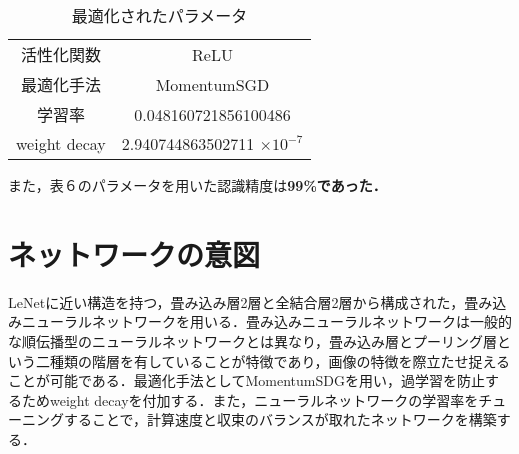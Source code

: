 \documentclass[a4paper, 12pt, dvipdfmx]{jarticle}
\begin{document}
\begin{table}[htb]
  \centering
  \caption{最適化されたパラメータ}
  \begin{tabular}{c|c} \hline
    活性化関数 & ReLU\\
    最適化手法 & MomentumSGD \\
    学習率 & 0.048160721856100486 \\
    weight decay & 2.940744863502711 $\times 10^{-7}$ \\ \hline
  \end{tabular}
\end{table}
また，表６のパラメータを用いた認識精度は\bf{99\%}であった．


\section{ネットワークの意図}
LeNetに近い構造を持つ，畳み込み層2層と全結合層2層から構成された，畳み込みニューラルネットワークを用いる．畳み込みニューラルネットワークは一般的な順伝播型のニューラルネットワークとは異なり，畳み込み層とプーリング層という二種類の階層を有していることが特徴であり，画像の特徴を際立たせ捉えることが可能である．最適化手法としてMomentumSDGを用い，過学習を防止するためweight decayを付加する．また，ニューラルネットワークの学習率をチューニングすることで，計算速度と収束のバランスが取れたネットワークを構築する．
\end{document}
